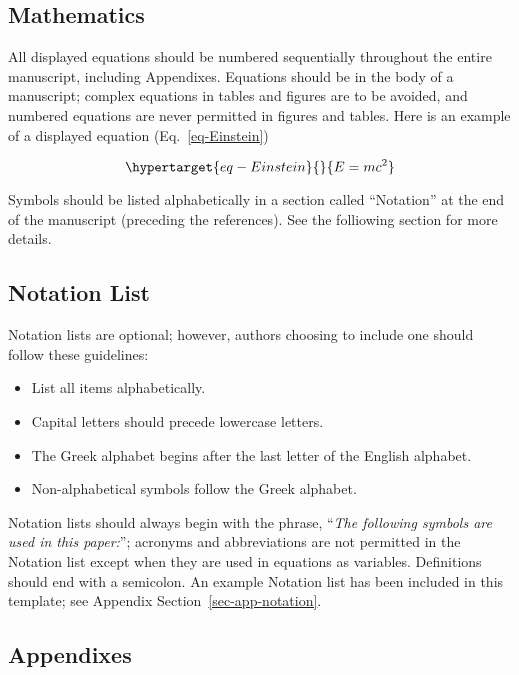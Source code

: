 \documentclass[
  NewProceedings,
  letterpaper]{./assets/ascelike-new}
\begin{document}
\hypertarget{mathematics}{%
\subsection{Mathematics}\label{mathematics}}

All displayed equations should be numbered sequentially throughout the
entire manuscript, including Appendixes. Equations should be in the body
of a manuscript; complex equations in tables and figures are to be
avoided, and numbered equations are never permitted in figures and
tables. Here is an example of a displayed equation
(Eq.~\ref{eq-Einstein})

\begin{equation}\protect\hypertarget{eq-Einstein}{}{
E = m c^{2}
}\label{eq-Einstein}\end{equation}

Symbols should be listed alphabetically in a section called ``Notation''
at the end of the manuscript (preceding the references). See the
folliowing section for more details.

\hypertarget{notation-list}{%
\subsection{Notation List}\label{notation-list}}

Notation lists are optional; however, authors choosing to include one
should follow these guidelines:

\begin{itemize}
\item
  List all items alphabetically.
\item
  Capital letters should precede lowercase letters.
\item
  The Greek alphabet begins after the last letter of the English
  alphabet.
\item
  Non-alphabetical symbols follow the Greek alphabet.
\end{itemize}

Notation lists should always begin with the phrase, ``\emph{The
following symbols are used in this paper:}''; acronyms and abbreviations
are not permitted in the Notation list except when they are used in
equations as variables. Definitions should end with a semicolon. An
example Notation list has been included in this template; see Appendix
Section~\ref{sec-app-notation}.

\hypertarget{appendixes}{%
\subsection{Appendixes}\label{appendixes}}
\end{document}
